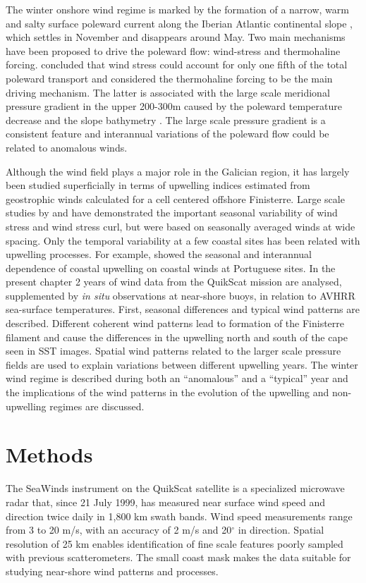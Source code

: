 The winter onshore wind regime is marked by the formation of a
narrow, warm and salty surface poleward current along the Iberian
Atlantic continental slope \citep{Frouin90,Haynes90}, which
settles in November and disappears around May. Two main mechanisms
have been proposed to drive the poleward flow: wind-stress and
thermohaline forcing. \citet{Frouin90} concluded that wind stress
could account for only one fifth of the total poleward transport
and considered the thermohaline forcing to be the main driving
mechanism. The latter is associated with the large scale
meridional pressure gradient in the upper 200-300m caused by the
poleward temperature decrease and the slope bathymetry
\citep{Huthnance95}. The large scale pressure gradient is a
consistent feature and interannual variations of the poleward flow
could be related to anomalous winds.

Although the wind field plays a major role in the Galician region,
it has largely been studied superficially in terms of upwelling
indices estimated from geostrophic winds calculated for a cell
centered offshore Finisterre. Large scale studies by
\citet{Bakun91} and \citet{Wooster76} have demonstrated the
important seasonal variability of wind stress and wind stress
curl, but were based on seasonally averaged winds at wide spacing.
Only the temporal variability at a few coastal sites has been
related with upwelling processes. For example, \citet{Fiuza82b}
showed the seasonal and interannual dependence of coastal
upwelling on coastal winds at Portuguese sites. In the present
chapter 2 years of wind data from the QuikScat mission are
analysed, supplemented by {\it in situ} observations at near-shore
buoys, in relation to AVHRR sea-surface temperatures. First,
seasonal differences and typical wind patterns are described.
Different coherent wind patterns lead to formation of the
Finisterre filament and cause the differences in the upwelling
north and south of the cape seen in SST images. Spatial wind
patterns related to the larger scale pressure fields are used to
explain variations between different upwelling years. The winter
wind regime is described during both an ``anomalous'' and a
``typical'' year and the implications of the wind patterns in the
evolution of the upwelling and non-upwelling regimes are
discussed.

\section{Methods}
\label{metodos}  The SeaWinds instrument on the QuikScat satellite
is a specialized microwave radar that, since 21 July 1999, has
measured near surface wind speed and direction twice daily in
1,800 km swath bands. Wind speed measurements range from 3 to 20
m/s, with an accuracy of 2 m/s and 20$^{\circ}$ in direction.
Spatial resolution of 25 km enables identification of fine scale
features poorly sampled with previous scatterometers. The small
coast mask makes the data suitable for studying near-shore wind
patterns and processes.

